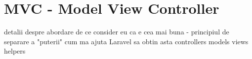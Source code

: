 \section{MVC - Model View Controller}
	detalii despre abordare
	de ce consider eu ca e cea mai buna - principiul de separare a "puterii"
	cum ma ajuta Laravel sa obtin asta
	{controllers}
	{models}
	{views}
	{helpers}